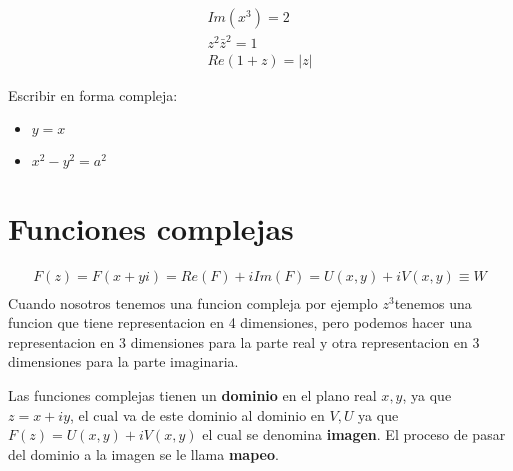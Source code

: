 \documentclass{article}
\newcommand{\caja}[3]{%
  \begin{tcolorbox}[colback=#1!5!white,colframe=#1!25!black,title=#2]
    #3
  \end{tcolorbox}%
}
\begin{document}
\caja{red}{Ej }{
  \begin{gather}
    Im(x ^ {3 }) = 2 \\
    z^2 \bar z^2  = 1 \\
    Re(1+z) = |z| 
    \label{eq:ej5}
  \end{gather}
}
\caja{black}{Tarea }{
  Escribir en forma compleja:
  \begin{itemize}
    \item $ y=x  $
    \item $ x ^ {2 } - y ^ {2 } = a ^ {2 } $
  \end{itemize}
}

\section{Funciones complejas }
\begin{gather}
  F(z) = F(x+yi )= Re(F)+i Im(F)= U(x,y)+iV(x,y) \equiv W \\
  \label{eq:funcion_compleja}
\end{gather}
Cuando nosotros tenemos una funcion compleja por ejemplo $ z ^ {3 } $tenemos una funcion que tiene representacion en 4 dimensiones, pero podemos hacer una representacion en 3 dimensiones para la parte real y otra representacion en 3 dimensiones para la parte imaginaria. 

Las funciones complejas tienen un \textbf{dominio} en el plano real $ x,y  $, ya que $ z=x+iy  $, el cual va de este dominio al dominio en $ V,U  $ ya que $ F(z) = U(x,y)+i V(x,y) $ el cual se denomina \textbf{imagen}. El proceso de pasar del dominio a la imagen se le llama \textbf{mapeo}.
\end{document}
